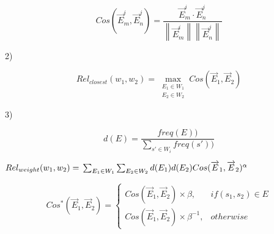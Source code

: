\begin{small}
    \begin{equation}
        \label{cos}
        \nonumber
        Cos(\overrightarrow E_m^i,\overrightarrow E_n^j) = \frac{\overrightarrow E_m^i \cdot 
        \overrightarrow E_n^j}{\left \| \overrightarrow E_m^i \right \|\left \| \overrightarrow E_n^j \right \|}
    \end{equation}
\end{small}

2) 
\begin{small}
    \begin{equation}
        \label{cos}
        \nonumber
        Rel_{closest}(w_1, w_2) = \max \limits_{\substack{E_1 \in W_1 \\ E_2 \in W_2}}
        Cos(\overrightarrow E_1,\overrightarrow E_2)
    \end{equation}
\end{small}

3) 
\begin{small}
    \begin{equation}
        \label{cos}
        \nonumber
        d(E) = \frac{freq(E))}{\sum_{{s}'\in W_i} freq({s}'))}
    \end{equation}
\end{small}

\begin{small}
    \begin{math}
        \label{cos}
        \nonumber
        Rel_{weight}(w_1, w_2)= \\
        \sum_{E_1 \in W_1}\sum_{E_2 \in W_2}d(E_1)d(E_2)Cos(\overrightarrow E_1,\overrightarrow E_2)^\alpha 
    \end{math}
\end{small}

\begin{small}
    \begin{equation}
        \label{cos}
        \nonumber
        Cos^*(\overrightarrow E_1,\overrightarrow E_2)=
        \begin{cases} 
        Cos(\overrightarrow E_1,\overrightarrow E_2) \times \beta, &if(s_1, s_2) \in E\\
        Cos(\overrightarrow E_1,\overrightarrow E_2) \times \beta^{-1}, &otherwise
        \end{cases}
    \end{equation}
\end{small}


\cite{acl/IacobacciPN15}